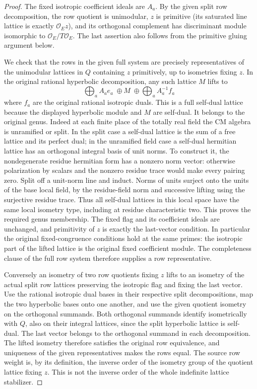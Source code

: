 \begin{proof}
The fixed isotropic coefficient ideals are \(A_a\).
By the given split row decomposition, the row quotient
is unimodular, \(z\) is primitive (its saturated line
lattice is exactly \(\mathcal O_Ez\)), and its orthogonal
complement has discriminant module isomorphic to
\(\mathcal O_E/T\mathcal O_E\). The last assertion
also follows from the primitive gluing argument below.

We check that the rows in the given full system are
precisely representatives of the unimodular lattices in
\(Q\) containing \(z\) primitively, up to isometries
fixing \(z\). In the original rational hyperbolic
decomposition, any such lattice \(M\) lifts to
\[
 \bigoplus_a A_ae_a\;\oplus M\;\oplus
 \bigoplus_a A_a^{-1}f_a
\]
where \(f_a\) are the original rational isotropic duals.
This is a full self-dual lattice because the displayed
hyperbolic module and \(M\) are self-dual. It belongs
to the original genus. Indeed at each finite place
of the totally real field the CM algebra is unramified
or split. In the split case a self-dual lattice is the
sum of a free lattice and its perfect dual; in the
unramified field case a self-dual hermitian lattice
has an orthogonal integral basis of unit norms. To
construct it, the nondegenerate residue hermitian form
has a nonzero norm vector: otherwise polarization by
scalars and the nonzero residue trace would make
every pairing zero. Split off a unit-norm line and
induct. Norms of units surject onto the units of the
base local field, by the residue-field norm and
successive lifting using the surjective residue trace.
Thus all self-dual lattices in this local space have
the same local isometry type, including at residue
characteristic two. This proves the required genus
membership. The fixed flag and its coefficient ideals
are unchanged, and primitivity of \(z\) is exactly the
last-vector condition. In particular the original
fixed-congruence conditions hold at the same primes:
the isotropic part of the lifted lattice is the
original fixed coefficient module. The completeness
clause of the full row system therefore supplies a row
representative.

Conversely an isometry of two row quotients fixing \(z\)
lifts to an isometry of the actual split row lattices
preserving the isotropic flag and fixing the last vector.
Use the rational isotropic dual bases in their respective
split decompositions, map the two hyperbolic bases onto
one another, and use the given quotient isometry on the
orthogonal summands. Both orthogonal summands identify
isometrically with \(Q\), also on their integral lattices,
since the split hyperbolic lattice is self-dual. The
last vector belongs to the orthogonal summand in each
decomposition. The lifted isometry therefore satisfies
the original row equivalence, and uniqueness of the
given representatives makes the rows equal. The
source row weight is, by its definition, the inverse
order of the isometry group of the quotient lattice
fixing \(z\). This is not the inverse order of the
whole indefinite lattice stabilizer.


\end{proof}
